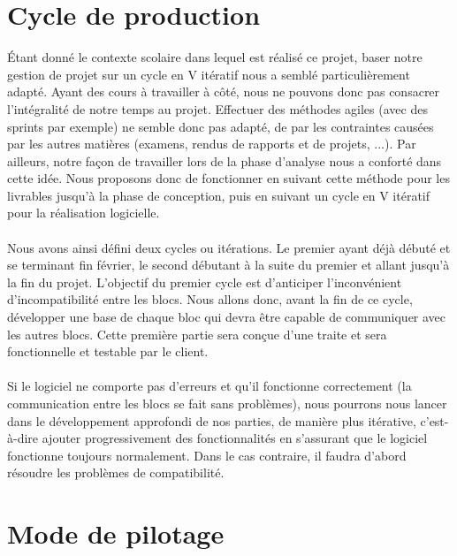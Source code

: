 \section{Cycle de production}

Étant donné le contexte scolaire dans lequel est réalisé ce projet, baser notre gestion de projet sur un cycle en V itératif nous a semblé particulièrement adapté. Ayant des cours à travailler à côté, nous ne pouvons donc pas consacrer l’intégralité de notre temps au projet. Effectuer des méthodes agiles (avec des sprints par exemple) ne semble donc pas adapté, de par les contraintes causées par les autres matières (examens, rendus de rapports et de projets, ...). Par ailleurs, notre
façon de travailler lors de la phase d’analyse nous a conforté dans cette idée. Nous proposons donc de fonctionner en suivant cette méthode pour les livrables jusqu’à la phase de conception, puis en suivant un cycle en V itératif pour la réalisation logicielle. 

\paragraph{}

Nous avons ainsi défini deux cycles ou itérations. Le premier ayant déjà débuté et se terminant fin février, le second débutant à la suite du premier et allant jusqu’à la fin du projet. L’objectif du premier cycle est d’anticiper l’inconvénient d’incompatibilité entre les blocs. Nous allons donc, avant la fin de ce cycle, développer une base de chaque bloc qui devra être capable de communiquer avec les autres blocs. Cette première partie sera conçue d’une traite et sera fonctionnelle et testable par le client.

\newpage

\paragraph{}

Si le logiciel ne comporte pas d’erreurs et qu’il fonctionne correctement (la communication entre les blocs se fait sans problèmes), nous pourrons nous lancer dans le développement approfondi de nos parties, de manière plus itérative, c’est-à-dire ajouter progressivement des fonctionnalités en s’assurant que le logiciel fonctionne toujours normalement. Dans le cas contraire, il faudra d’abord résoudre les problèmes de compatibilité.

\section{Mode de pilotage}


